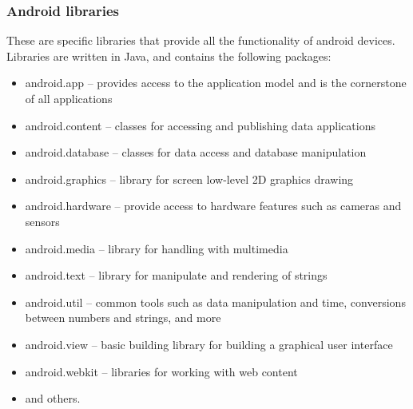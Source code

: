 \subsubsection{Android libraries}
These are specific libraries that provide all the functionality of android devices. Libraries are written in Java, and contains the following packages:

\begin{itemize}%
\item android.app -- provides access to the application model and is the cornerstone of all applications
\item android.content -- classes for accessing and publishing data applications
\item android.database -- classes for data access and database manipulation 
\item android.graphics -- library for screen low-level 2D graphics drawing
\item android.hardware -- provide access to hardware features such as cameras and sensors
\item android.media -- library for handling with multimedia 
\item android.text -- library for manipulate and rendering of strings
\item android.util -- common tools such as data manipulation and time, conversions between numbers and strings, and more
\item android.view -- basic building library for building a graphical user interface
\item android.webkit -- libraries for working with web content
\item and others.
\end{itemize}

